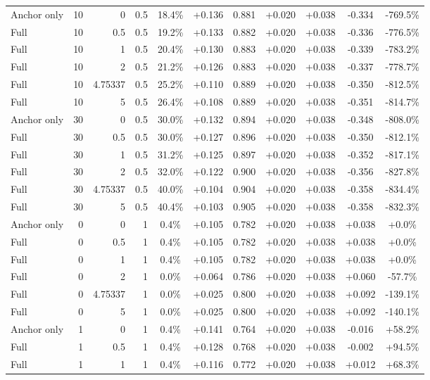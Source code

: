 \begin{table}[htbp]
\begin{tabular}{lrrrccccccc}
Anchor only & 10 & 0 & 0.5 & 18.4\% & +0.136 & 0.881 & +0.020 & +0.038 & -0.334 & -769.5\% \\
Full & 10 & 0.5 & 0.5 & 19.2\% & +0.133 & 0.882 & +0.020 & +0.038 & -0.336 & -776.5\% \\
Full & 10 & 1 & 0.5 & 20.4\% & +0.130 & 0.883 & +0.020 & +0.038 & -0.339 & -783.2\% \\
Full & 10 & 2 & 0.5 & 21.2\% & +0.126 & 0.883 & +0.020 & +0.038 & -0.337 & -778.7\% \\
Full & 10 & 4.75337 & 0.5 & 25.2\% & +0.110 & 0.889 & +0.020 & +0.038 & -0.350 & -812.5\% \\
Full & 10 & 5 & 0.5 & 26.4\% & +0.108 & 0.889 & +0.020 & +0.038 & -0.351 & -814.7\% \\
Anchor only & 30 & 0 & 0.5 & 30.0\% & +0.132 & 0.894 & +0.020 & +0.038 & -0.348 & -808.0\% \\
Full & 30 & 0.5 & 0.5 & 30.0\% & +0.127 & 0.896 & +0.020 & +0.038 & -0.350 & -812.1\% \\
Full & 30 & 1 & 0.5 & 31.2\% & +0.125 & 0.897 & +0.020 & +0.038 & -0.352 & -817.1\% \\
Full & 30 & 2 & 0.5 & 32.0\% & +0.122 & 0.900 & +0.020 & +0.038 & -0.356 & -827.8\% \\
Full & 30 & 4.75337 & 0.5 & 40.0\% & +0.104 & 0.904 & +0.020 & +0.038 & -0.358 & -834.4\% \\
Full & 30 & 5 & 0.5 & 40.4\% & +0.103 & 0.905 & +0.020 & +0.038 & -0.358 & -832.3\% \\
Anchor only & 0 & 0 & 1 & 0.4\% & +0.105 & 0.782 & +0.020 & +0.038 & +0.038 & +0.0\% \\
Full & 0 & 0.5 & 1 & 0.4\% & +0.105 & 0.782 & +0.020 & +0.038 & +0.038 & +0.0\% \\
Full & 0 & 1 & 1 & 0.4\% & +0.105 & 0.782 & +0.020 & +0.038 & +0.038 & +0.0\% \\
Full & 0 & 2 & 1 & 0.0\% & +0.064 & 0.786 & +0.020 & +0.038 & +0.060 & -57.7\% \\
Full & 0 & 4.75337 & 1 & 0.0\% & +0.025 & 0.800 & +0.020 & +0.038 & +0.092 & -139.1\% \\
Full & 0 & 5 & 1 & 0.0\% & +0.025 & 0.800 & +0.020 & +0.038 & +0.092 & -140.1\% \\
Anchor only & 1 & 0 & 1 & 0.4\% & +0.141 & 0.764 & +0.020 & +0.038 & -0.016 & +58.2\% \\
Full & 1 & 0.5 & 1 & 0.4\% & +0.128 & 0.768 & +0.020 & +0.038 & -0.002 & +94.5\% \\
Full & 1 & 1 & 1 & 0.4\% & +0.116 & 0.772 & +0.020 & +0.038 & +0.012 & +68.3\% \\

\end{tabular}
\end{table}
